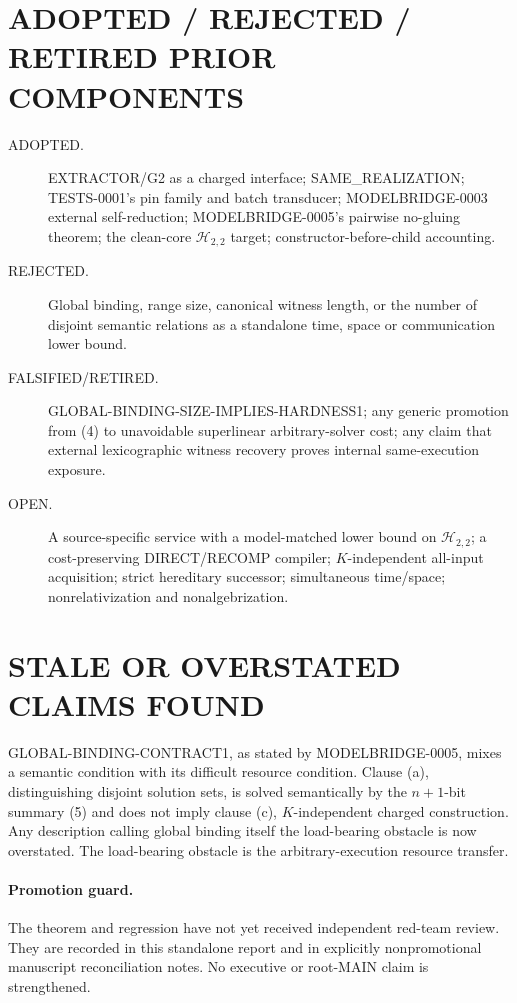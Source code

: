 \documentclass[11pt]{article}
\begin{document}
\section{ADOPTED / REJECTED / RETIRED PRIOR COMPONENTS}
\begin{description}
\item[ADOPTED.] EXTRACTOR/G2 as a charged interface; SAME\_REALIZATION;
TESTS-0001's pin family and batch transducer; MODELBRIDGE-0003 external
self-reduction; MODELBRIDGE-0005's pairwise no-gluing theorem; the clean-core
$\mathcal H_{2,2}$ target; constructor-before-child accounting.
\item[REJECTED.] Global binding, range size, canonical witness length, or
the number of disjoint semantic relations as a standalone time, space or
communication lower bound.
\item[FALSIFIED/RETIRED.] \textsf{GLOBAL-BINDING-SIZE-IMPLIES-HARDNESS1};
any generic promotion from (4) to unavoidable superlinear arbitrary-solver
cost; any claim that external lexicographic witness recovery proves internal
same-execution exposure.
\item[OPEN.] A source-specific service with a model-matched lower bound on
$\mathcal H_{2,2}$; a cost-preserving DIRECT/RECOMP compiler; $K$-independent
all-input acquisition; strict hereditary successor; simultaneous time/space;
nonrelativization and nonalgebrization.
\end{description}

\section{STALE OR OVERSTATED CLAIMS FOUND}
GLOBAL-BINDING-CONTRACT1, as stated by MODELBRIDGE-0005, mixes a semantic
condition with its difficult resource condition.  Clause (a), distinguishing
disjoint solution sets, is solved semantically by the $n+1$-bit summary (5)
and does not imply clause (c), $K$-independent charged construction.  Any
description calling global binding itself the load-bearing obstacle is now
overstated.  The load-bearing obstacle is the arbitrary-execution resource
transfer.

\paragraph{Promotion guard.}
The theorem and regression have not yet received independent red-team
review.  They are recorded in this standalone report and in explicitly
nonpromotional manuscript reconciliation notes.  No executive or root-MAIN
claim is strengthened.
\end{document}
